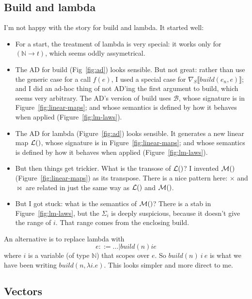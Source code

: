 \documentclass[sigplan,review]{acmart}
\renewcommand{\to}{\rightarrow}    %
\newcommand{\grad}[1]{\nabla_S\lb #1 \rb}  %
\newcommand{\lb}{\llbracket}
\newcommand{\rb}{\rrbracket}
\newcommand{\buildfun}{\mathit{build}}
\newcommand{\nat}{\mathbb{N}}        %
\newcommand{\lmpair}{\times}         %
\newcommand{\lmjoin}{\bowtie}        %
\newcommand{\lmlam}[1]{{\mathcal L}(#1)}      %
\newcommand{\lmlamt}[1]{{\mathcal M}(#1)}     %
\newcommand{\lmbuild}{\mathcal B}             %
\begin{document}
\subsection{Build and lambda}

I'm not happy with the story for build and lambda. It started well:
\begin{itemize}
\item For a start, the treatment of lambda is very special: it works only
  for $(\nat \to t)$, which seems oddly assymetrical.

\item The AD for build (Fig~\ref{fig:ad}) looks sensible.
  But not great:  rather than use the generic case for a call $f(e)$,
  I used a special case for $\grad{\buildfun(e_n,e)}$; and I did
  an ad-hoc thing of not AD'ing the first argument to build, which
  seems very arbitrary.  The AD's version of build uses $\lmbuild$, whose
  signature is in Figure~\ref{fig:linear-maps}; and whose semantics is
  defined by how it behaves when applied (Figure~\ref{fig:lm-laws}).

\item The AD for lambda (Figure~\ref{fig:ad}) looks sensible.  It generates
  a new linear map $\lmlam$, whose
  signature is in Figure~\ref{fig:linear-maps}; and whose semantics is
  defined by how it behaves when applied (Figure~\ref{fig:lm-laws}).

\item But then things get trickier.  What is the transose of $\lmlam$?
  I invented $\lmlamt$ (Figure~\ref{fig:linear-maps}) as its transpose.
  There is a nice pattern here: $\lmpair$ and $\lmjoin$ are related
  in just the same way as $\lmlam$ and $\lmlamt$.

\item But I got stuck: what is the semantics of $\lmlamt$?
  There is a stab in Figure~\ref{fig:lm-laws}, but the $\Sigma_i$ is deeply
  suspicious, because it doesn't give the range of $i$.  That range comes
  from the enclosing build.
\end{itemize}

An alternative is to replace lambda with
$$
e ::= \ldots | \buildfun(n) i e
$$
where $i$ is a variable (of type $\nat$) that scopes over $e$.
So $\buildfun(n)~ i~ e$ is what we have been writing $\buildfun(n, \lambda i.e)$.
This looks simpler and more direct to me.

\subsection{Vectors}
\end{document}
